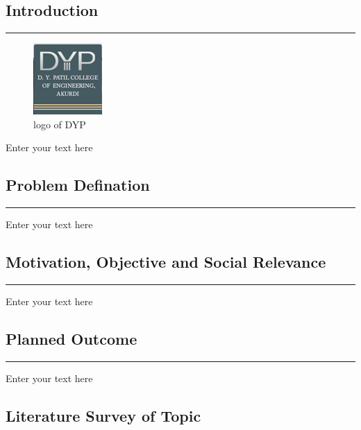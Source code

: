 \iffalse




\begin{flushright}
\section{\Large Introduction}
\end{flushright}
\hrule

\begin{figure}[h]
\centering
\includegraphics[height=.6in]{newlogo.png}
\caption{logo of DYP}
\end{figure}

Enter your text here
\newpage

\begin{flushright}
\subsection{\Large Problem Defination}
\end{flushright}

\hrule
Enter your text here
\newpage



\begin{flushright}
\subsection{\Large Motivation, Objective and Social Relevance}
\end{flushright}

\hrule
Enter your text here
\newpage


\begin{flushright}
\subsection{\Large Planned Outcome}
\end{flushright}

\hrule
Enter your text here
\newpage



\begin{flushright}
\section{\Large Literature Survey of Topic}
\end{flushright}

